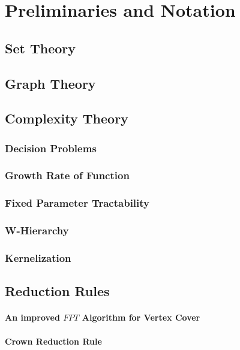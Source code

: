 \chapter{Preliminaries and Notation} \label{chap:prelim}
\section{Set Theory} \label{sec:set}
\section{Graph Theory}  \label{sec:graph}
\section{Complexity Theory} \label{sec:complex}
\subsection{Decision Problems} \label{subsec:decision}
\subsection{Growth Rate of Function} \label{subsec:growth}
\subsection{Fixed Parameter Tractability} \label{subsec:fpt}
\subsection{W-Hierarchy} \label{subsec:whierarchy}
\subsection{Kernelization} \label{subsec:kern}
\section{Reduction Rules} \label{sec:reduce}
\subsubsection{An improved ${FPT}$ Algorithm for Vertex Cover} \label{subsubsec:fptvc}
\subsubsection{Crown Reduction Rule} \label{subsubsec:crown}

